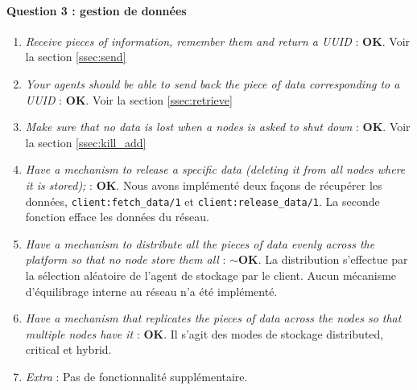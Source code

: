 \documentclass[a4paper]{article}
\begin{document}
\paragraph{Question 3 : gestion de données}
\begin{enumerate}[label=\alph*)]
    \item \textit{Receive pieces of information, remember them and return a UUID} : \textbf{OK}. Voir la section \ref{ssec:send}
    \item \textit{Your agents should be able to send back the piece of data corresponding to a UUID} : \textbf{OK}. Voir la section \ref{ssec:retrieve}
    \item \textit{Make sure that no data is lost when a nodes is asked to shut down} : \textbf{OK}. Voir la section \ref{ssec:kill_add}
    \item \textit{Have a mechanism to release a specific data (deleting it from all nodes where it is stored);} : \textbf{OK}. Nous avons implémenté deux façons de récupérer les données, \texttt{client:fetch\_data/1} et \texttt{client:release\_data/1}. La seconde fonction efface les données du réseau.
    \item \textit{Have a mechanism to distribute all the pieces of data evenly across the platform so that no node store them all} :
    \textbf{$\sim$OK}. La distribution s'effectue par la sélection aléatoire de l'agent de stockage par le client. Aucun mécanisme d'équilibrage interne au réseau n'a été implémenté.
    \item \textit{Have a mechanism that replicates the pieces of data across the nodes so that multiple nodes
have it} : \textbf{OK}. Il s'agit des modes de stockage distributed, critical et hybrid.
    \item \textit{Extra} : Pas de fonctionnalité supplémentaire.
\end{enumerate}
\end{document}
